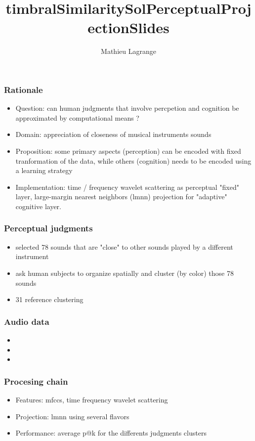 \documentclass{beamer}
\title{timbralSimilaritySolPerceptualProjectionSlides}
\author{ Mathieu Lagrange }
\begin{document}
\maketitle

\begin{frame}\frametitle{Rationale}
\begin{itemize}
  \item Question: can human judgments that involve percpetion and cognition be approximated by computational means ?
  \item Domain: appreciation of closeness of musical instruments sounds
  \item Proposition: some primary aspects (perception) can be encoded with fixed tranformation of the data, while others (cognition) needs to be encoded using a learning strategy
  \item Implementation: time / frequency wavelet scattering as perceptual "fixed" layer, large-margin nearest neighbors (lmnn) projection for "adaptive" cognitive layer.
\end{itemize}
\end{frame}

\begin{frame}\frametitle{Perceptual judgments}
\begin{itemize}
  \item selected 78 sounds that are "close" to other sounds played by a different instrument
  \item ask human subjects to organize spatially and cluster (by color) those 78 sounds
  \item 31 reference clustering
\end{itemize}
\end{frame}

\begin{frame}\frametitle{Audio data}
\begin{itemize}
  \item
  \item
  \item
\end{itemize}
\end{frame}

\begin{frame}\frametitle{Procesing chain}
\begin{itemize}
  \item Features: mfccs, time frequency wavelet scattering
  \item Projection: lmnn using several flavors
  \item Performance: average p@k for the differents judgments clusters
\end{itemize}
\end{frame}
\end{document}
